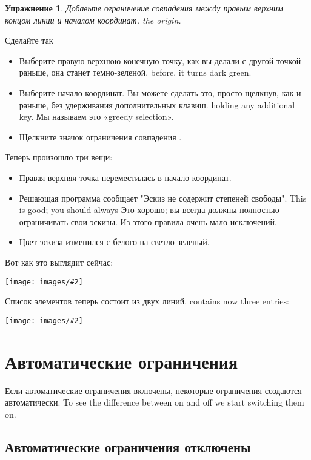 \documentclass[12pt,titlepage]{article}
\newcommand{\icon}[1]{\raisebox{-1em}{\rule{0pt}{27pt}\texttt{[image: images/\#1]}}}
\newcommand{\img}[2]{\vspace{2ex}\noindent\texttt{[image: images/\#2]}}
\newtheorem{Exercise}{Упражнение}
\begin{document}
\begin{Exercise}
\label{ExerciseCoincidence}
Добавьте ограничение совпадения между правым верхним концом линии и началом координат.
the origin.
\end{Exercise}

Сделайте так
\begin{itemize}
\item Выберите правую верхнюю конечную точку, как вы делали с другой точкой раньше, она станет темно-зеленой.
      before, it turns dark green.
\item Выберите начало координат. Вы можете сделать это, просто щелкнув, как и раньше, без удерживания дополнительных клавиш.
      holding any additional key. Мы называем это «greedy selection».
\item Щелкните значок ограничения совпадения \icon {Constraint_PointOnPoint}.
\end{itemize}

Теперь произошло три вещи:
\begin{itemize}
\item Правая верхняя точка переместилась в начало координат.
\item Решающая программа сообщает "Эскиз не содержит степеней свободы". This is good; you should always
      Это хорошо; вы всегда должны полностью ограничивать свои эскизы. Из этого правила очень мало исключений.
\item Цвет эскиза изменился с белого на светло-зеленый.
\end{itemize}

Вот как это выглядит сейчас:

\img{width=8cm}{Fully1}

\item Список элементов теперь состоит из двух линий.
contains now three entries:

\img{}{Constraints2}

\section{Автоматические ограничения}
Если автоматические ограничения включены, некоторые ограничения создаются автоматически. To see
the difference between on and off we start switching them on.

\subsection{Автоматические ограничения отключены}
\end{document}
